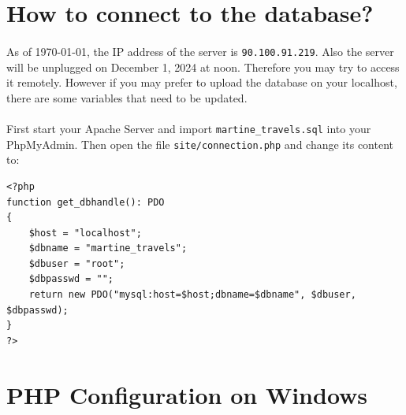 \documentclass[11pt,a4paper,titlepage]{article}
\begin{document}
\section{How to connect to the database?} \label{DB_Connect}
\paragraph{}
As of \today, the IP address of the server is \verb|90.100.91.219|. Also the server will be unplugged on December 1, 2024 at noon. Therefore you may try to access it remotely. However if you may prefer to upload the database on your localhost, there are some variables that need to be updated.
\paragraph{}
First start your Apache Server and import \verb|martine_travels.sql| into your PhpMyAdmin. Then open the file \verb|site/connection.php| and change its content to:

\begin{verbatim}
<?php
function get_dbhandle(): PDO
{
	$host = "localhost";
	$dbname = "martine_travels";
	$dbuser = "root";
	$dbpasswd = "";
	return new PDO("mysql:host=$host;dbname=$dbname", $dbuser, $dbpasswd);
}
?>
\end{verbatim}

\section{PHP Configuration on Windows}

\newpage


\end{document}
